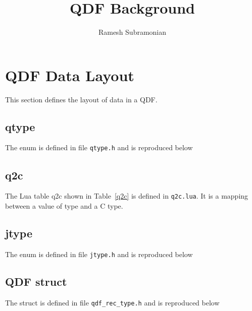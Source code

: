 \title{QDF Background} %
\author{Ramesh Subramonian } %
\maketitle %

\section{QDF Data Layout}

This section defines the layout of data in a QDF. 



\subsection{qtype}

The enum \qt is defined in file \verb+qtype.h+ and is reproduced below 


\subsection{q2c}

The Lua table q2c shown in Table~\ref{q2c} is defined in \verb+q2c.lua+.
It is a mapping between a value of type \qt and a C type.


\subsection{jtype}

The enum \jt is defined in file \verb+jtype.h+ and is reproduced below


\subsection{QDF struct} 
The struct \qdf is defined in file \verb+qdf_rec_type.h+ and is reproduced below









